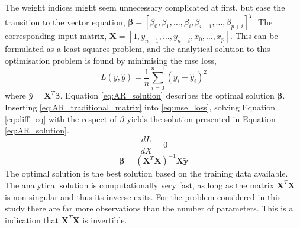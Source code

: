 The weight indices might seem unnecessary complicated at first, but ease the transition to the vector equation, $\mathbf{\beta} = [\beta_0, \beta_1, \ldots, \beta_i, \beta_{i+1}, \ldots, \beta_{p+i}]^T$. The corresponding input matrix, $\mathbf{X} = [1, y_{n-1}, \ldots, y_{n-i}, x_0, \ldots, x_p]$. 
This can be formulated as a least-squares problem, and the analytical solution to this optimisation problem is found by minimising the \acrfull{mse} loss, 
\begin{equation} \label{eq:mse_loss}
    L (\tilde{y}, \hat{y}) = \frac{1}{n} \sum_{i=0}^{n-1}(\tilde{y}_i-\hat{y}_i)^2
\end{equation} 
where $\hat{y} = \mathbf{X}^T \mathbf{\beta}$. Equation \eqref{eq:AR_solution} describes the optimal solution $\mathbf{\beta}$. Inserting \eqref{eq:AR_traditional_matrix} into \eqref{eq:mse_loss}, solving Equation \eqref{eq:diff_eq} with the respect of $\beta$ yields the solution presented in Equation \eqref{eq:AR_solution}.  
\begin{equation} \label{eq:diff_eq}
    \frac{dL}{dX} = 0
\end{equation}
\begin{equation} \label{eq:AR_solution}
    \mathbf{\beta}  = \left( \mathbf{X}^T\mathbf{X}\right)^{-1} \mathbf{X}\tilde{\mathbf{y}}
\end{equation}
The optimal solution is the best solution based on the training data available. The analytical solution is computationally very fast, as long as the matrix $\mathbf{X}^T\mathbf{X}$ is non-singular and thus its inverse exits. For the problem considered in this study there are far more observations than the number of parameters. This is a indication that $\mathbf{X}^T\mathbf{X}$ is invertible. %

